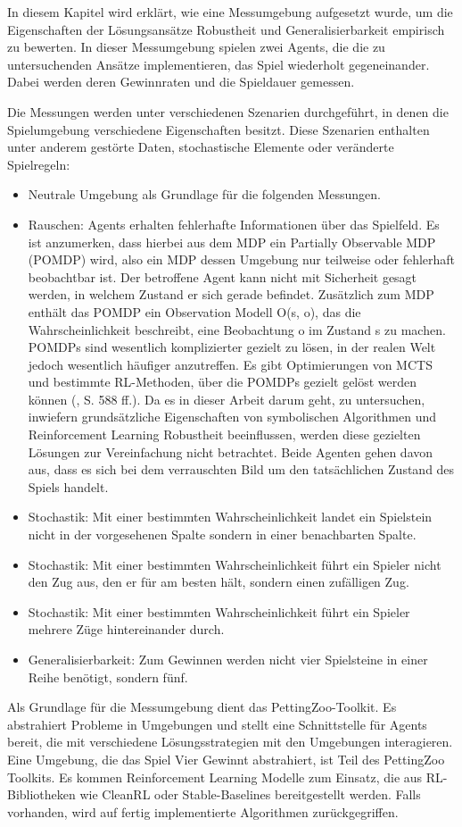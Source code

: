 In diesem Kapitel wird erklärt, wie eine Messumgebung aufgesetzt wurde, um die Eigenschaften der Lösungsansätze Robustheit und Generalisierbarkeit empirisch zu bewerten. In dieser Messumgebung spielen zwei Agents, die die zu untersuchenden Ansätze implementieren, das Spiel wiederholt gegeneinander. Dabei werden deren Gewinnraten und die Spieldauer gemessen.

Die Messungen werden unter verschiedenen Szenarien durchgeführt, in denen die Spiel\-umgebung verschiedene Eigenschaften besitzt. Diese Szenarien enthalten unter anderem gestörte Daten, stochastische Elemente oder veränderte Spielregeln:

\begin{itemize}
	\item Neutrale Umgebung als Grundlage für die folgenden Messungen.
	\item Rauschen: Agents erhalten fehlerhafte Informationen über das Spielfeld. Es ist anzumerken, dass hierbei aus dem MDP ein Partially Observable MDP (POMDP) wird, also ein MDP dessen Umgebung nur teilweise oder fehlerhaft beobachtbar ist. Der betroffene Agent kann nicht mit Sicherheit gesagt werden, in welchem Zustand er sich gerade befindet. Zusätzlich zum MDP enthält das POMDP ein Observation Modell O(s, o), das die Wahrscheinlichkeit beschreibt, eine Beobachtung o im Zustand s zu machen. POMDPs sind wesentlich komplizierter gezielt zu lösen, in der realen Welt jedoch wesentlich häufiger anzutreffen. Es gibt Optimierungen von MCTS und bestimmte RL-Methoden, über die POMDPs gezielt gelöst werden können (\cite{Russell.2020}, S. 588 ff.). Da es in dieser Arbeit darum geht, zu untersuchen, inwiefern grundsätzliche Eigenschaften von symbolischen Algorithmen und Reinforcement Learning Robustheit beeinflussen, werden diese gezielten Lösungen zur Vereinfachung nicht betrachtet. Beide Agenten gehen davon aus, dass es sich bei dem verrauschten Bild um den tatsächlichen Zustand des Spiels handelt.
	\item Stochastik: Mit einer bestimmten Wahrscheinlichkeit landet ein Spielstein nicht in der vorgesehenen Spalte sondern in einer benachbarten Spalte.
	\item Stochastik: Mit einer bestimmten Wahrscheinlichkeit führt ein Spieler nicht den Zug aus, den er für am besten hält, sondern einen zufälligen Zug.
	\item Stochastik: Mit einer bestimmten Wahrscheinlichkeit führt ein Spieler mehrere Züge hintereinander durch.
	\item Generalisierbarkeit: Zum Gewinnen werden nicht vier Spielsteine in einer Reihe benötigt, sondern fünf.
\end{itemize}

Als Grundlage für die Messumgebung dient das PettingZoo-Toolkit. Es abstrahiert Probleme in Umgebungen und stellt eine Schnittstelle für Agents bereit, die mit verschiedene Lösungsstrategien mit den Umgebungen interagieren. Eine Umgebung, die das Spiel Vier Gewinnt abstrahiert, ist Teil des PettingZoo Toolkits. Es kommen Reinforcement Learning Modelle zum Einsatz, die aus RL-Bibliotheken wie CleanRL oder Stable-Baselines bereitgestellt werden. Falls vorhanden, wird auf fertig implementierte Algorithmen zurückgegriffen.